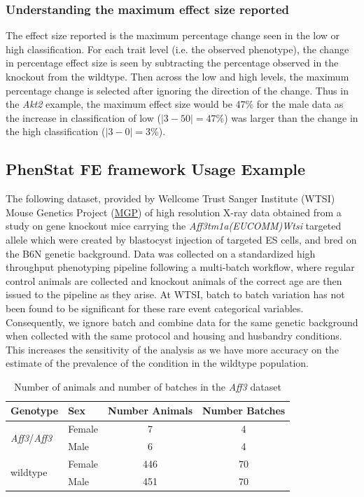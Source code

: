 \documentclass[12pt,a4paper]{article}
\begin{document}
\subsubsection{Understanding the maximum effect size reported}
The effect size reported is the maximum percentage change seen in the low or high classification. For each trait level (i.e. the observed phenotype), the change in percentage effect size is seen by subtracting the percentage observed in the knockout from the wildtype. Then across the low and high levels, the maximum percentage change is selected after ignoring the direction of the change. Thus in the \textit{Akt2} example, the maximum effect size would be 47\% for the male data as the increase in classification of low ($|3-50|=47$\%) was larger than the change in the high classification ($|3-0|=3$\%). 

\subsection{PhenStat FE framework Usage Example}
The following dataset, provided by Wellcome Trust Sanger Institute (WTSI) Mouse Genetics Project (\href{http://www.sanger.ac.uk/resources/mouse/}{MGP}) of high resolution X-ray data obtained from 
a study on gene knockout mice carrying the \textit{Aff3tm1a(EUCOMM)Wtsi} targeted allele which were created by blastocyst injection of targeted ES cells, and bred on the B6N genetic background. 
Data was collected on a standardized high throughput phenotyping pipeline following a multi-batch workflow, where regular control animals are collected and knockout animals of the correct age are then issued to the pipeline as they arise. 
At WTSI, batch to batch variation has not been found to be significant for these rare event categorical variables. 
Consequently, we ignore batch and combine data for the same genetic background when collected with the same protocol and housing and husbandry conditions. 
This increases the sensitivity of the analysis as we have more accuracy on the estimate of the prevalence of the condition in the wildtype population.

\begin{table}[!h]
\begin{center}
\begin{tabular}{| l | l | c | c |}
  \hline
Genotype&Sex&Number Animals&Number Batches\\\hline
\multirow{2}{*}{\textit{Aff3}\slash \textit{Aff3}}&Female&7&4\\
			    &Male&6&4\\
			    \hline
\multirow{2}{*}{wildtype}&Female&446&70\\
			    &Male&451&70\\

\hline  
\end{tabular}
\caption{Number of animals and number of batches in the \textit{Aff3} dataset}\label{table:09}
\end{center}
\end{table}
\end{document}
